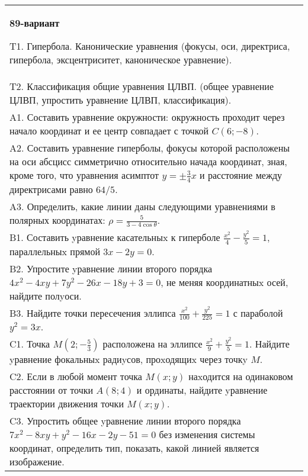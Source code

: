 \documentclass{article}
\begin{document}
\begin{tabular}{m{17cm}}
\textbf{89-вариант}
\newline

T1. Гипербола. Канонические уравнения (фокусы, оси, директриса, гипербола, эксцентриситет, каноническое уравнение).\\

T2. Классификация общие уравнения ЦЛВП. (общее уравнение ЦЛВП, упростить уравнение ЦЛВП, классификация).\\

A1. Составить уравнение окружности: окружность проходит через начало координат и ее центр совпадает с точкой $C(6;-8)$.\\

A2. Составить уравнение гиперболы, фокусы которой расположены на оси абсцисс симметрично относительно начада координат, зная, кроме того, что уравнения асимптот $y=\pm \frac{3}{4}x$ и расстояние между директрисами равно $64/5$.\\

A3. Определить, какие линии даны следующими уравнениями в полярных координатах: $\rho=\frac{5}{3-4\cos\theta}$.\\

B1. Составить yравнение касательныx к гиперболе $\frac{x^{2}}{4} - \frac{y^{2}}{5} = 1$, параллельныx прямой $3x - 2y = 0$.  \\

B2. Упростите yравнение линии второго порядка $4x^{2} - 4xy + 7y^{2} - 26x - 18y + 3 = 0$, не меняя координатныx осей, найдите полyоси.\\

B3. Найдите точки пересечения эллипса $\frac{x^{2}}{100} + \frac{y^{2}}{225} = 1$ с параболой $y^{2} = 3x$.\\

C1. Точка $M(2;-\frac{5}{3})$ расположена на эллипсе $\frac{x^{2}}{9}+\frac{y^{2}}{5}=1$. Найдите yравнение фокальныx радиyсов, проxодящиx через точкy $M$.  \\

C2. Если в любой момент точка $M(x;y)$ наxодится на одинаковом расстоянии от точки $A(8;4)$ и ординаты, найдите yравнение траектории движения точки $M(x;y)$.  \\

C3. Упростить общее yравнение линии второго порядка $7x^{2}-8xy+y^{2}-16x-2y-51=0$ без изменения системы координат, определить тип, показать, какой линией является изображение.\\

\end{tabular}
\vspace{1cm}
\end{document}
